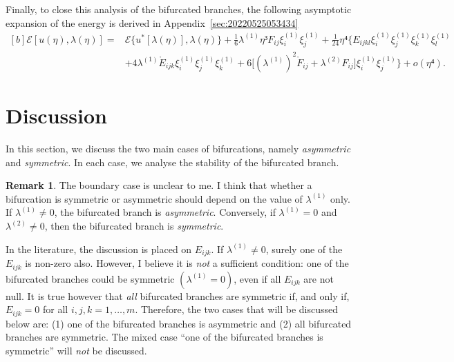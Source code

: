 \documentclass[12pt, final]{scrartcl}
\theoremstyle{definition}
\newtheorem{remark}{Remark}
\newcommand{\E}{\mathcal E}
\newcommand{\order}[2][1]{#2^{(#1)}}
\begin{document}
Finally, to close this analysis of the bifurcated branches, the following
asymptotic expansion of the energy is derived in
Appendix~\ref{sec:20220525053434}
\begin{equation}
  \label{eq:20220525053600}
  \begin{aligned}[b]
    \E[u(η), \lambda(η)] ={} & \E\{u^{\ast}[\lambda(η)], \lambda(η)\} + \tfrac{1}{6} \order[1]\lambda η³ F_{i j} \order[1]{ξ_i} \order[1]{ξ_j} + \tfrac{1}{24} η⁴ \bigl\{E_{ijkl} \order[1]{ξ_i} \order[1]{ξ_j} \order[1]{ξ_k} \order[1]{ξ_l}\\
    & + 4\order[1]\lambda \mathring{E}_{ijk} \order[1]{ξ_i} \order[1]{ξ_j} \order[1]{ξ_k} + 6 \bigl[( \order[1]\lambda )^2 \mathring{F}_{ij} + \order[2]\lambda F_{ij}\bigr] \order[1]{ξ_i} \order[1]{ξ_j}\bigr\} + o(η⁴).
  \end{aligned}
\end{equation}

\section{Discussion}

In this section, we discuss the two main cases of bifurcations, namely
\emph{asymmetric} and \emph{symmetric}. In each case, we analyse the stability
of the bifurcated branch.

\begin{remark}
  The boundary case is unclear to me. I think that whether a bifurcation is
  symmetric or asymmetric should depend on the value of $\order[1]\lambda$ only. If
  $\order[1]\lambda ≠ 0$, the bifurcated branch is \emph{asymmetric}. Conversely, if
  $\order[1]\lambda = 0$ and $\order[2]\lambda ≠ 0$, then the bifurcated branch is \emph{symmetric}.

  In the literature, the discussion is placed on $E_{ijk}$. If $\order[1]\lambda ≠ 0$,
  surely one of the $E_{ijk}$ is non-zero also. However, I believe it is
  \emph{not} a sufficient condition: one of the bifurcated branches could be
  symmetric $(\order[1]\lambda = 0)$, even if all $E_{ijk}$ are not null. It is true
  however that \emph{all} bifurcated branches are symmetric if, and only if,
  $E_{ijk}=0$ for all $i, j, k = 1, \ldots, m$. Therefore, the two cases
  that will be discussed below are: (1) one of the bifurcated branches is
  asymmetric and (2) all bifurcated branches are symmetric. The mixed case ``one
  of the bifurcated branches is symmetric'' will \emph{not} be discussed.
\end{remark}
\end{document}
